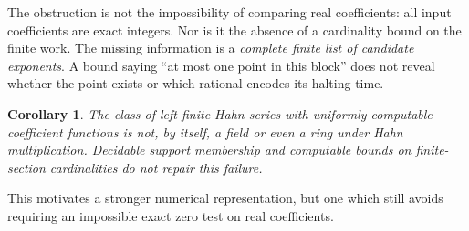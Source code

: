 \documentclass[11pt,letterpaper]{article}
\numberwithin{equation}{section}
\newtheorem{corollary}[theorem]{Corollary}
\theoremstyle{definition}
\theoremstyle{remark}
\begin{document}
The obstruction is not the impossibility of comparing real coefficients:
all input coefficients are exact integers. Nor is it the absence of a
cardinality bound on the finite work. The missing information is a
\emph{complete finite list of candidate exponents}. A bound saying ``at
most one point in this block'' does not reveal whether the point exists or
which rational encodes its halting time.

\begin{corollary}
The class of left-finite Hahn series with uniformly computable coefficient
functions is not, by itself, a field or even a ring under Hahn multiplication.
Decidable support membership and computable bounds on finite-section
cardinalities do not repair this failure.
\end{corollary}

This motivates a stronger numerical representation, but one which still
avoids requiring an impossible exact zero test on real coefficients.
\end{document}
